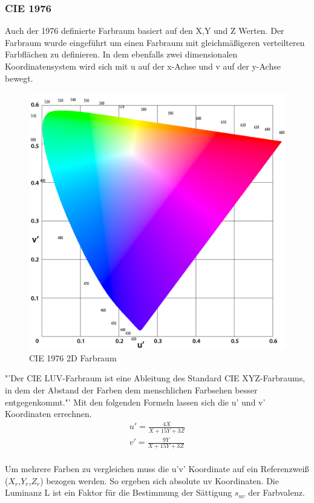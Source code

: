 \documentclass[11pt]{scrartcl}
\begin{document}
\subsubsection{CIE 1976}
Auch der 1976 definierte Farbraum basiert auf den X,Y und Z Werten. Der Farbraum wurde eingeführt um einen Farbraum mit gleichmäßigeren verteilteren Farbflächen zu
definieren. In dem ebenfalls zwei dimensionalen Koordinatensystem wird sich mit u auf der x-Achse und v auf der y-Achse bewegt.
\begin{figure}[H]
    \begin{center}
        \includegraphics[width=.7\textwidth]{images/cie_1976.png}
    \end{center}
    \caption{CIE 1976 2D Farbraum \cite{wikipedia1976}}
\end{figure}
\noindent
"'Der CIE LUV-Farbraum ist eine Ableitung des Standard CIE XYZ-Farbraums, in dem der Abstand der Farben dem menschlichen Farbsehen besser entgegenkommt."' \cite{wisotoLuv}
Mit den folgenden Formeln lassen sich die u' und v' Koordinaten errechnen.
\begin{align}\label{Equ:9}
    u' = \frac{4X}{X+15Y+3Z}\\
    v' = \frac{9Y}{X+15Y+3Z}
\end{align}
\cite{lindbloom}\\
Um mehrere Farben zu vergleichen muss die u'v' Koordinate auf ein Referenzweiß ($X_r$,$Y_r$,$Z_r$) bezogen werden. So ergeben sich absolute uv Koordinaten. Die Luminanz
L ist ein Faktor für die Bestimmung der Sättigung $s_{uv}$ der Farbvalenz. \cite{wikipedia1976}
\end{document}
